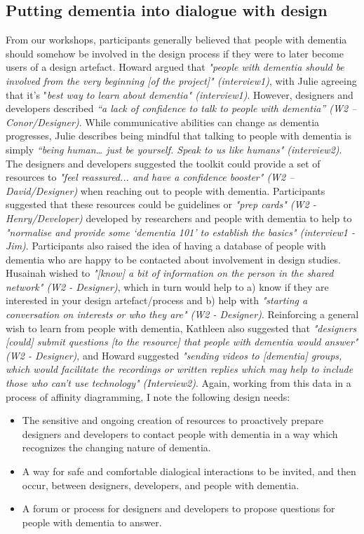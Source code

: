 \subsection{Putting dementia into dialogue with design}
From our workshops, participants generally believed that people with dementia should somehow be involved in the design process if they were to later become users of a design artefact. Howard argued that \textit{"people with dementia should be involved from the very beginning [of the project]" (interview1)}, with Julie agreeing that it’s "\textit{best way to learn about dementia" (interview1)}. However, designers and developers described \textit{“a lack of confidence to talk to people with dementia” (W2 – Conor/Designer)}. While communicative abilities can change as dementia progresses, Julie describes being mindful that talking to people with dementia is simply \textit{“being human… just be yourself. Speak to us like humans" (interview2)}.
The designers and developers suggested the toolkit could provide a set of resources to \textit{"feel reassured... and have a confidence booster" (W2 – David/Designer)} when reaching out to people with dementia. Participants suggested that these resources could be guidelines or \textit{"prep cards" (W2 - Henry/Developer)} developed by researchers and people with dementia to help to \textit{"normalise and provide some ‘dementia 101’ to establish the basics" (interview1 - Jim)}. Participants also raised the idea of having a database of people with dementia who are happy to be contacted about involvement in design studies. Husainah wished to \textit{"[know] a bit of information on the person in the shared network" (W2 - Designer)}, which in turn would help to a) know if they are interested in your design artefact/process and b) help with \textit{"starting a conversation on interests or who they are" (W2 - Designer)}.
Reinforcing a general wish to learn from people with dementia, Kathleen also suggested that \textit{"designers [could] submit questions [to the resource] that people with dementia would answer" (W2 - Designer)}, and Howard suggested \textit{"sending videos to [dementia] groups, which would facilitate the recordings or written replies which may help to include those who can't use technology" (Interview2)}. Again, working from this data in a process of affinity diagramming, I note the following design needs:
\begin{itemize}
\item The sensitive and ongoing creation of resources to proactively prepare designers and developers to contact people with dementia in a way which recognizes the changing nature of dementia. 
\item A way for safe and comfortable dialogical interactions to be invited, and then occur, between designers, developers, and people with dementia.
\item A forum or process for designers and developers to propose questions for people with dementia to answer.
\end{itemize}

